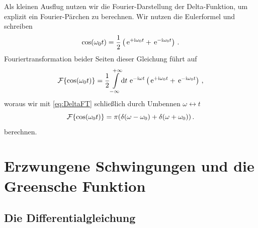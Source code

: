 \documentclass[paper=a4, fontsize=11.0pt, abstractoff, DIV12]{scrartcl}
\begin{document}
Als kleinen Ausflug nutzen wir die Fourier-Darstellung der Delta-Funktion,
um explizit ein Fourier-Pärchen zu berechnen.
Wir nutzen die Eulerformel und schreiben
\begin{equation}
\cos(\omega_0 t) = \frac{1}{2}\left(\,{\mathrm{e}}^{+\mathrm{i}\omega_0t} + \,{\mathrm{e}}^{-\mathrm{i}\omega_0 t}\right)\,.
\end{equation}
Fouriertransformation beider Seiten dieser Gleichung führt auf
\begin{equation}
\operatorname{\mathcal{F}}\{\cos(\omega_0t)\} = \frac{1}{2} \int\limits_{-\infty}^{+\infty}\!\mathrm{d} t\, \,{\mathrm{e}}^{-\mathrm{i}\omega t}\left( \,{\mathrm{e}}^{+\mathrm{i}\omega_0 t}+\,{\mathrm{e}}^{-\mathrm{i}\omega_0 t}\right)\,,
\end{equation}
woraus wir mit \eqref{eq:DeltaFT} schließlich durch Umbennen $\omega
\leftrightarrow t$
\begin{equation}
\operatorname{\mathcal{F}}\{ \cos(\omega_0 t) \} = \pi(\delta(\omega-\omega_0) + \delta(\omega+\omega_0))\,.
\end{equation}
berechnen.


\section{Erzwungene Schwingungen und die Greensche Funktion}

\subsection{Die Differentialgleichung}
\end{document}
